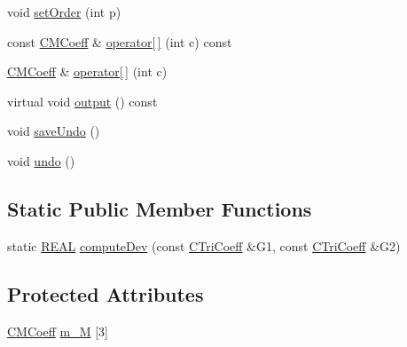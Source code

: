 \begin{DoxyCompactItemize}
\item 
void \hyperlink{classCTriCoeff_a8df569d14c28af368916f6d6258faa35}{set\-Order} (int p)
\item 
const \hyperlink{classCMCoeff}{C\-M\-Coeff} \& \hyperlink{classCTriCoeff_ae1643fb9444f997935013aeef30a7c1e}{operator\mbox{[}$\,$\mbox{]}} (int c) const 
\item 
\hyperlink{classCMCoeff}{C\-M\-Coeff} \& \hyperlink{classCTriCoeff_ad336c1bb46a865f0543c13ec3bf10557}{operator\mbox{[}$\,$\mbox{]}} (int c)
\item 
virtual void \hyperlink{classCTriCoeff_ad4c1064a7de4dd89f81959d842812ee2}{output} () const 
\item 
void \hyperlink{classCTriCoeff_a9886af4188561152d331366cfaec1c53}{save\-Undo} ()
\item 
void \hyperlink{classCTriCoeff_a8202256093cb071f6ae95887ea1c8dde}{undo} ()
\end{DoxyCompactItemize}
\subsection*{Static Public Member Functions}
\begin{DoxyCompactItemize}
\item 
static \hyperlink{util_8h_a5821460e95a0800cf9f24c38915cbbde}{R\-E\-A\-L} \hyperlink{classCTriCoeff_a5966b12dbe81e9e50f5397647cb18044}{compute\-Dev} (const \hyperlink{classCTriCoeff}{C\-Tri\-Coeff} \&G1, const \hyperlink{classCTriCoeff}{C\-Tri\-Coeff} \&G2)
\end{DoxyCompactItemize}
\subsection*{Protected Attributes}
\begin{DoxyCompactItemize}
\item 
\hyperlink{classCMCoeff}{C\-M\-Coeff} \hyperlink{classCTriCoeff_afac3ecb3b5c965a7ba4cc0409c2100e8}{m\-\_\-\-M} \mbox{[}3\mbox{]}
\end{DoxyCompactItemize}
